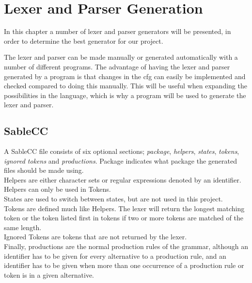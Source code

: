 \chapter{Lexer and Parser Generation}
In this chapter a number of lexer and parser generators will be presented, in order to determine the best generator for our project.

The lexer and parser can be made manually or generated automatically with a number of different programs. The advantage of having the lexer and parser generated by a program is that changes in the cfg can easily be implemented and checked compared to doing this manually. This will be useful when expanding the possibilities in the language, which is why a program will be used to generate the lexer and parser.


\section{SableCC}
A SableCC file consists of six optional sections; \textit{package}, \textit{helpers}, \textit{states}, \textit{tokens}, \textit{ignored tokens} and \textit{productions}.
Package indicates what package the generated files should be made using. \\
Helpers are either character sets or regular expressions denoted by an identifier. Helpers can only be used in Tokens. \\
States are used to switch between states, but are not used in this project. \\
Tokens are defined much like Helpers. The lexer will return the longest matching token or the token listed first in tokens if two or more tokens are matched of the same length. \\
Ignored Tokens are tokens that are not returned by the lexer. \\
Finally, productions are the normal production rules of the grammar, although an identifier has to be given for every alternative to a production rule, and an identifier has to be given when more than one occurrence of a production rule or token is in a given alternative.

